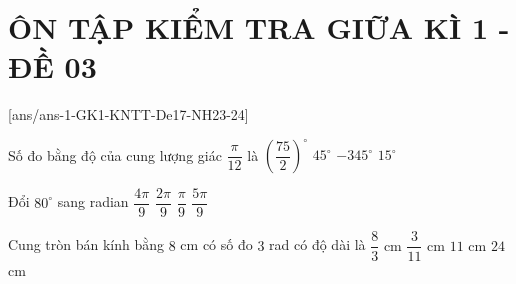 \section*{ÔN TẬP KIỂM TRA GIỮA KÌ 1 - ĐỀ 03}
\setcounter{ex}{0}\setcounter{bt}{0}
[ans/ans-1-GK1-KNTT-De17-NH23-24]
\begin{ex}%
Số đo bằng độ của cung lượng giác $\dfrac{\pi}{12}$ là
\choice
{$\left(\dfrac{75}{2}\right)^{\circ}$}
{$45^{\circ}$}
{$-345^{\circ}$}
{\True $15^{\circ}$}
	\end{ex}
\begin{ex}%
Đổi $80^{\circ}$ sang radian
	\choice
{\True $\dfrac{4 \pi}{9}$}
{$\dfrac{2 \pi}{9}$}
{$\dfrac{\pi}{9}$}
{$\dfrac{5 \pi}{9}$}
\end{ex}
\begin{ex}%
Cung tròn bán kính bằng $8$ cm có số đo $3$ rad có độ dài là
	\choice
	{$\dfrac{8}{3}$ cm}
	{$\dfrac{3}{11}$ cm}
	{$11$ cm}
	{\True $24$ cm}
\end{ex}
	
